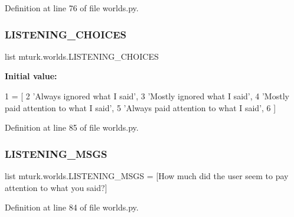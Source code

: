 Definition at line 76 of file worlds.\+py.

\mbox{\label{namespacemturk_1_1worlds_a66c071fb0ea81947607647934f5508de}} 
\subsubsection{\texorpdfstring{L\+I\+S\+T\+E\+N\+I\+N\+G\+\_\+\+C\+H\+O\+I\+C\+ES}{LISTENING\_CHOICES}}
{\footnotesize\ttfamily list mturk.\+worlds.\+L\+I\+S\+T\+E\+N\+I\+N\+G\+\_\+\+C\+H\+O\+I\+C\+ES}

{\bfseries Initial value\+:}
\begin{DoxyCode}
1 =  [
2     \textcolor{stringliteral}{'Always ignored what I said'},
3     \textcolor{stringliteral}{'Mostly ignored what I said'},
4     \textcolor{stringliteral}{'Mostly paid attention to what I said'},
5     \textcolor{stringliteral}{'Always paid attention to what I said'},
6 ]
\end{DoxyCode}


Definition at line 85 of file worlds.\+py.

\mbox{\label{namespacemturk_1_1worlds_a25cc504c121e495b794bc274228260f0}} 
\subsubsection{\texorpdfstring{L\+I\+S\+T\+E\+N\+I\+N\+G\+\_\+\+M\+S\+GS}{LISTENING\_MSGS}}
{\footnotesize\ttfamily list mturk.\+worlds.\+L\+I\+S\+T\+E\+N\+I\+N\+G\+\_\+\+M\+S\+GS = \mbox{[}\textquotesingle{}How much did the user seem to pay attention to what you said?\textquotesingle{}\mbox{]}}



Definition at line 84 of file worlds.\+py.

\mbox{\label{namespacemturk_1_1worlds_a518280763b71ba5d455e81994bb72295}} 
